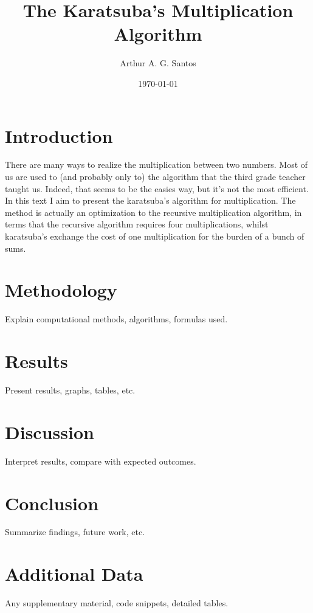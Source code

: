 \documentclass[12pt,a4paper]{article}
\title{The Karatsuba's Multiplication Algorithm}
\author{Arthur A. G. Santos}
\date{\today}
\begin{document}
\maketitle
\tableofcontents
\newpage

\section{Introduction}
There are many ways to realize the multiplication between two numbers. Most of us are used to (and probably only to) the algorithm that the third grade teacher taught us.
Indeed, that seems to be the easies way, but it's not the most efficient. In this text I aim to present the karatsuba's algorithm for multiplication.
The method is actually an optimization to the recursive multiplication algorithm, in terms that the recursive algorithm requires four multiplications, whilst karatsuba's exchange the cost of one multiplication
for the burden of a bunch of sums. 

\section{Methodology}
Explain computational methods, algorithms, formulas used.

\section{Results}
Present results, graphs, tables, etc.

\section{Discussion}
Interpret results, compare with expected outcomes.

\section{Conclusion}
Summarize findings, future work, etc.

\appendix
\section{Additional Data}
Any supplementary material, code snippets, detailed tables.
\end{document}
